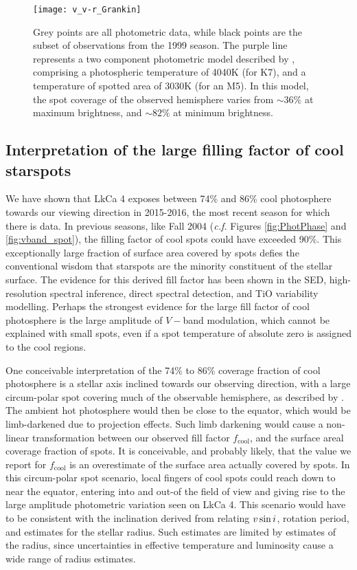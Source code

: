 \documentclass[twocolumn]{emulateapj}%
\begin{document}
\begin{figure}
 \centering
\texttt{[image: v\_v-r\_Grankin]} 
\caption{Grey points are all \citet{grankin08} photometric data, while black points are the subset of observations from the 1999 season.  The purple line represents a two component photometric model  described by \citet{grankin08}, comprising a photospheric temperature of 4040K (for K7), and a temperature of spotted area of 3030K (for an M5). In this model, the spot coverage of the observed hemisphere varies from $\sim36\%$ at maximum brightness, and $\sim82\%$ at minimum brightness.}
 \label{fig:grankin_vr}
\end{figure}


\subsection{Interpretation of the large filling factor of cool starspots}
We have shown that LkCa 4 exposes between 74\% and 86\% cool photosphere towards our viewing direction in 2015-2016, the most recent season for which there is data.  In previous seasons, like Fall 2004 (\emph{c.f.} Figures \ref{fig:PhotPhase} and \ref{fig:vband_spot}), the filling factor of cool spots could have exceeded 90\%.  This exceptionally large fraction of surface area covered by spots defies the conventional wisdom that starspots are the minority constituent of the stellar surface.  The evidence for this derived fill factor has been shown in the SED, high-resolution spectral inference, direct spectral detection, and TiO variability modelling.  Perhaps the strongest evidence for the large fill factor of cool photosphere is the large amplitude of $V-$band modulation, which cannot be explained with small spots, even if a spot temperature of absolute zero is assigned to the cool regions.

One conceivable interpretation of the 74\% to 86\% coverage fraction of cool photosphere is a stellar axis inclined towards our observing direction, with a large circum-polar spot covering much of the observable hemisphere, as described by \citet{donati14}.  The ambient hot photosphere would then be close to the equator, which would be limb-darkened due to projection effects.  Such limb darkening would cause a non-linear transformation between our observed fill factor $f_{\mathrm{cool}}$, and the surface areal coverage fraction of spots.  It is conceivable, and probably likely, that the value we report for $f_{\mathrm{cool}}$ is an overestimate of the surface area actually covered by spots.  In this circum-polar spot scenario, local fingers of cool spots could reach down to near the equator, entering into and out-of the field of view and giving rise to the large amplitude photometric variation seen on LkCa 4.  This scenario would have to be consistent with the inclination derived from relating $v \sin i$, rotation period, and estimates for the stellar radius.  Such estimates are limited by estimates of the radius, since uncertainties in effective temperature and luminosity cause a wide range of radius estimates.
\end{document}
